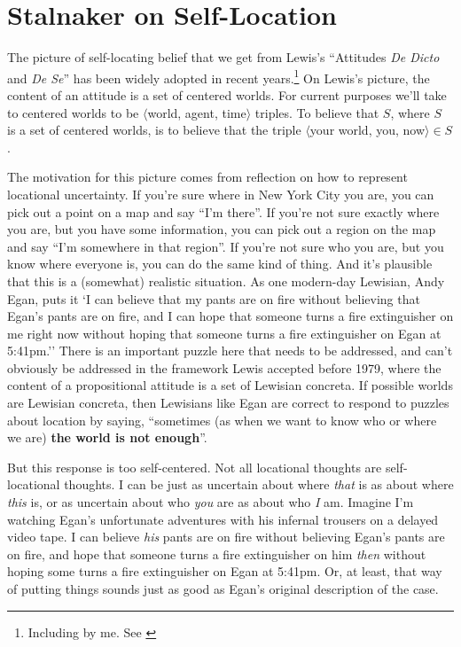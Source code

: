 \section{Stalnaker on Self-Location}
The picture of self-locating belief that we get from Lewis's ``Attitudes \textit{De Dicto} and \textit{De Se}'' \citep{Lewis1979b} has been widely adopted in recent years.\footnote{Including by me. See \citet{Egan2005-EGAEMI}} On Lewis's picture, the content of an attitude is a set of centered worlds. For current purposes we'll take to centered worlds to be \(\langle \)world, agent, time\(\rangle \) triples. To believe that \(S\), where \(S\) is a set of centered worlds, is to believe that the triple  \(\langle \)your world, you, now\(\rangle  \in S\).

The motivation for this picture comes from reflection on how to represent locational uncertainty. If you're sure where in New York City you are, you can pick out a point on a map and say ``I'm there''. If you're not sure exactly where you are, but you have some information, you can pick out a region on the map and say ``I'm somewhere in that region''. If you're not sure who you are, but you know where everyone is, you can do the same kind of thing. And it's plausible that this is a (somewhat) realistic situation. As one modern-day Lewisian, Andy Egan, puts it `I can believe that my pants are on fire without believing that Egan's pants are on fire, and I can hope that someone turns a fire extinguisher on me right now without hoping that someone turns a fire extinguisher on Egan at 5:41pm.'' \citep[64]{Egan2004-JACSPA-2} There is an important puzzle here that needs to be addressed, and can't obviously be addressed in the framework Lewis accepted before 1979, where the content of a propositional attitude is a set of Lewisian concreta. If possible worlds are Lewisian concreta, then Lewisians like Egan are correct to respond to puzzles about location by saying, ``sometimes (as when we want to know who or where we are) \textbf{the world is not enough}''. \citep[64]{Egan2004-JACSPA-2}

But this response is too self\hyp{}centered. Not all locational thoughts are self\hyp{}locational thoughts. I can be just as uncertain about where \textit{that} is as about where \textit{this} is, or as uncertain about who \textit{you} are as about who \textit{I} am. Imagine I'm watching Egan's unfortunate adventures with his infernal trousers on a delayed video tape. I can believe \textit{his} pants are on fire without believing Egan's pants are on fire, and hope that someone turns a fire extinguisher on him \textit{then} without hoping some turns a fire extinguisher on Egan at 5:41pm. Or, at least, that way of putting things sounds just as good as Egan's original description of the case.


